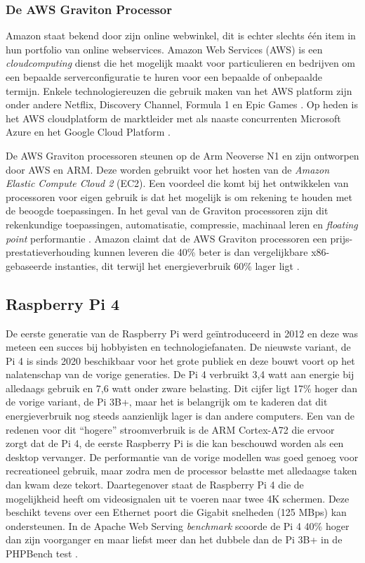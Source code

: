 \subsubsection{De AWS Graviton Processor}
Amazon staat bekend door zijn online webwinkel, dit is echter slechts één item in hun portfolio van online webservices. Amazon Web Services (AWS) is een \textit{cloudcomputing} dienst die het mogelijk maakt voor particulieren en bedrijven om een bepaalde serverconfiguratie te huren voor een bepaalde of onbepaalde termijn. Enkele technologiereuzen die gebruik maken van het AWS platform zijn onder andere Netflix, Discovery Channel, Formula 1 en Epic Games \autocite{Amazon2022}. Op heden is het AWS cloudplatform de marktleider met als naaste concurrenten Microsoft Azure en het Google Cloud Platform \autocite{Alexandre2021}.

De AWS Graviton processoren steunen op de Arm Neoverse N1 en zijn ontworpen door AWS en ARM. Deze worden gebruikt voor het hosten van de \textit{Amazon Elastic Compute Cloud 2} (EC2). Een voordeel die komt bij het ontwikkelen van processoren voor eigen gebruik is dat het mogelijk is om rekening te houden met de beoogde toepassingen. In het geval van de Graviton processoren zijn dit rekenkundige toepassingen, automatisatie, compressie, machinaal leren en \textit{floating point} performantie \autocite{arm2021}. Amazon claimt dat de AWS Graviton processoren een prijs-prestatieverhouding kunnen leveren die 40\% beter is dan vergelijkbare x86-gebaseerde instanties, dit terwijl het energieverbruik 60\% lager ligt \autocite{Amazon2021}.

\subsection{Raspberry Pi 4}
De eerste generatie van de Raspberry Pi werd geïntroduceerd in 2012 en deze was meteen een succes bij hobbyisten en technologiefanaten. De nieuwste variant, de Pi 4 is sinds 2020 beschikbaar voor het grote publiek en deze bouwt voort op het nalatenschap van de vorige generaties. De Pi 4 verbruikt 3,4 watt aan energie bij alledaags gebruik en 7,6 watt onder zware belasting. Dit cijfer ligt 17\% hoger dan de vorige variant, de Pi 3B+, maar het is belangrijk om te kaderen dat dit energieverbruik nog steeds aanzienlijk lager is dan andere computers. Een van de redenen voor dit “hogere” stroomverbruik is de ARM Cortex-A72 die ervoor zorgt dat de Pi 4, de eerste Raspberry Pi is die kan beschouwd worden als een desktop vervanger. De performantie van de vorige modellen was goed genoeg voor recreationeel gebruik, maar zodra men de processor belastte met alledaagse taken dan kwam deze tekort. Daartegenover staat de Raspberry Pi 4 die de mogelijkheid heeft om videosignalen uit te voeren naar twee 4K schermen. Deze beschikt tevens over een Ethernet poort die Gigabit snelheden (125 MBps) kan ondersteunen. In de Apache Web Serving \textit{benchmark} scoorde de Pi 4 40\% hoger dan zijn voorganger en maar liefst meer dan het dubbele dan de Pi 3B+ in de PHPBench test \autocite{Piltch2020}.

